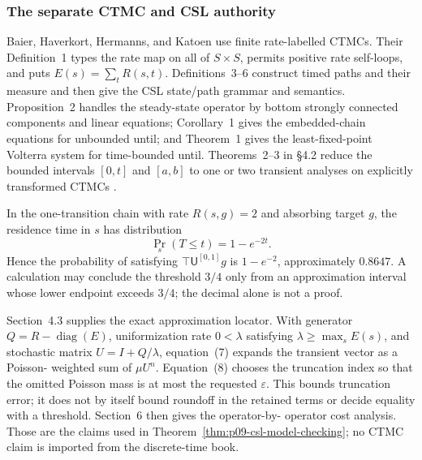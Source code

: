 \subsubsection{The separate CTMC and CSL authority}

Baier, Haverkort, Hermanns, and Katoen use finite rate-labelled CTMCs.  Their
Definition~1 types the rate map on all of \(S\times S\), permits positive rate
self-loops, and puts \(E(s)=\sum_tR(s,t)\).  Definitions~3--6 construct timed
paths and their measure and then give the CSL state/path grammar and semantics.
Proposition~2 handles the steady-state operator by bottom strongly connected
components and linear equations; Corollary~1 gives the embedded-chain equations
for unbounded until; and Theorem~1 gives the least-fixed-point Volterra system
for time-bounded until.  Theorems~2--3 in \S4.2 reduce the bounded intervals
\([0,t]\) and \([a,b]\) to one or two transient analyses on explicitly
transformed CTMCs \cite{BaierHaverkortHermannsKatoen2003}.

In the one-transition chain with rate \(R(s,g)=2\) and absorbing target \(g\),
the residence time in \(s\) has distribution
\[
 \Pr_s(T\leq t)=1-e^{-2t}.
\]
Hence the probability of satisfying
\(\top\mathsf U^{[0,1]}g\) is \(1-e^{-2}\), approximately \(0.8647\).  A
calculation may conclude the threshold \(3/4\) only from an approximation
interval whose lower endpoint exceeds \(3/4\); the decimal alone is not a
proof.

Section~4.3 supplies the exact approximation locator.  With generator
\(Q=R-\operatorname{diag}(E)\), uniformization rate
\(0<\lambda\) satisfying \(\lambda\geq\max_sE(s)\), and stochastic matrix
\(U=I+Q/\lambda\), equation~(7) expands the transient vector as a Poisson-
weighted sum of \(\mu U^n\).  Equation~(8) chooses the truncation index so that
the omitted Poisson mass is at most the requested \(\varepsilon\).  This bounds
truncation error; it does not by itself bound roundoff in the retained terms or
decide equality with a threshold.  Section~6 then gives the operator-by-
operator cost analysis.  Those are the claims used in
Theorem~\ref{thm:p09-csl-model-checking}; no CTMC claim is imported from the
discrete-time book.
